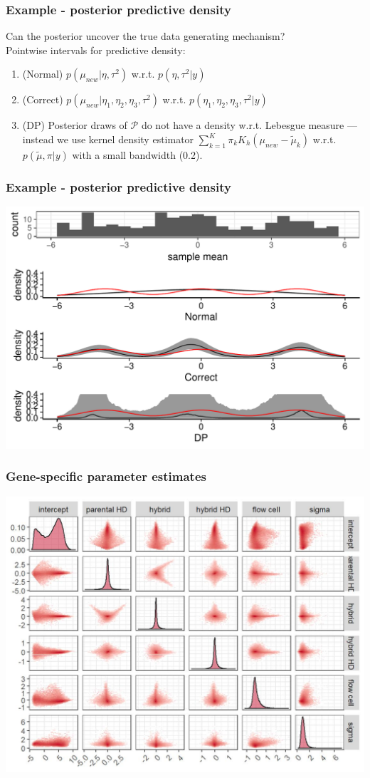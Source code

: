 \documentclass{beamer}
\begin{document}
\begin{frame}%
\frametitle{Example - posterior predictive density}
Can the posterior uncover the true data generating mechanism?\\
\pause Pointwise intervals for predictive density:
\begin{enumerate}
\pause \item (Normal) $p(\mu_{new}|\eta,\tau^2)$ w.r.t. $p(\eta,\tau^2|y)$
\pause \item (Correct) $p(\mu_{new}|\eta_1,\eta_2,\eta_3,\tau^2)$ w.r.t. $p(\eta_1,\eta_2,\eta_3,\tau^2|y)$
\pause \item (DP) Posterior draws of $\mathcal{P}$ do not have a density w.r.t. Lebesgue measure \pause ---  instead we use kernel density estimator $\sum_{k=1}^K \pi_k K_h(\mu_{new}-\tilde{\mu}_k)$ w.r.t. $p(\tilde{\mu},\pi|y)$ with a small bandwidth (0.2).
\end{enumerate}
\end{frame}

\begin{frame}%
\frametitle{Example - posterior predictive density}
\centering
\includegraphics[height=.92\textheight]{predictive_12_5}
\end{frame}

\begin{frame}%
\frametitle{Gene-specific parameter estimates}
{\centering
  \includegraphics[width=.8\textwidth]{pairs1} \\
}
\end{frame}
\end{document}
